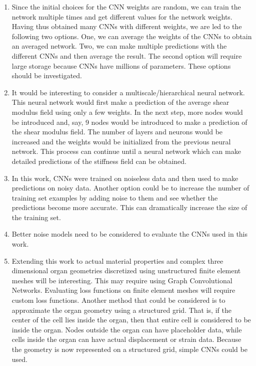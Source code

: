 \documentclass[12pt]{article}
\begin{document}
\begin{enumerate}
\item{Since the initial choices for the CNN weights are random, we can train the network multiple times and get different values for the network weights. Having thus obtained many CNNs with different weights, we are led to the following two options. One, we can average the weights of the CNNs to obtain an averaged network. Two, we can make multiple predictions with the different CNNs and then average the result. The second option will require large storage because CNNs have millions of parameters. These options should be investigated.}
\item{It would be interesting to consider a multiscale/hierarchical neural network. This neural network would first make a prediction of the average shear modulus field using only a few weights. In the next step, more nodes would be introduced and, say, 9 nodes would be introduced to make a prediction of the shear modulus field. The number of layers and neurons would be increased and the weights would be initialized from the previous neural network. This process can continue until a neural network which can make detailed predictions of the stiffness field can be obtained.}
\item{In this work, CNNs were trained on noiseless data and then used to make predictions on noisy data. Another option could be to increase the number of training set examples by adding noise to them and see whether the predictions become more accurate. This can dramatically increase the size of the training set.}
\item{Better noise models need to be considered to evaluate the CNNs used in this work.}
\item{Extending this work to actual material properties and complex three dimensional organ geometries discretized using unstructured finite element meshes will be interesting. This may require using Graph Convolutional Networks. Evaluating loss functions on finite element meshes will require custom loss functions. Another method that could be considered is to approximate the organ geometry using a structured grid. That is, if the center of the cell lies inside the organ, then that entire cell is considered to be inside the organ. Nodes outside the organ can have placeholder data, while cells inside the organ can have actual displacement or strain data. Because the geometry is now represented on a structured grid, simple CNNs could be used.}

\end{enumerate}
\end{document}
